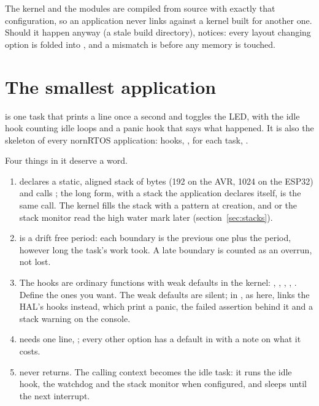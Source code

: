 The kernel and the modules are compiled from source with exactly that configuration, so
an application never links against a kernel built for another one. Should it happen
anyway (a stale build directory),  notices: every layout changing option
is folded into , and a mismatch is
 before any memory is touched.

\section{The smallest application}

 is one task that prints a line once a second and toggles the LED,
with the idle hook counting idle loops and a panic hook that says what happened. It is
also the skeleton of every nornRTOS application: hooks, ,
 for each task, .



Four things in it deserve a word.

\begin{enumerate}
\item {} declares a static, aligned
  stack of  bytes (192 on the AVR, 1024 on the ESP32) and
  calls ; the long form, with a stack the application declares
  itself, is the same call. The kernel fills the stack with a pattern at creation, and
   or the stack monitor read the high water mark later
  (section~\ref{sec:stacks}).
\item {} is a drift free period: each boundary is
  the previous one plus the period, however long the task's work took. A late boundary
  is counted as an overrun, not lost.
\item The hooks are ordinary functions with weak defaults in the kernel:
  , , ,
  , . Define the ones you want. The
  weak defaults are silent;  in , as
  here, links the HAL's hooks instead, which print a panic, the failed assertion behind
  it and a stack warning on the console.
\item {} needs one line, ; every other
  option has a default in  with a note on what it costs.
\item {} never returns. The calling context becomes the idle task: it
  runs the idle hook, the watchdog and the stack monitor when configured, and sleeps
  until the next interrupt.
\end{enumerate}

